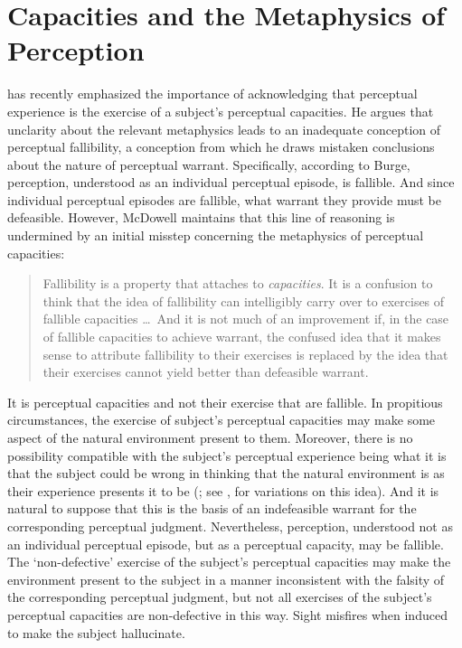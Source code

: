 \documentclass[12pt]{article}
\begin{document}

\section{Capacities and the Metaphysics of Perception} %
\label{sec:capacities_and_the_metaphysics_of_perception}

\citet{McDowell:2010fk} has recently emphasized the importance of acknowledging that perceptual experience is the exercise of a subject's perceptual capacities. He argues that unclarity about the relevant metaphysics leads \citet{Burge:2005uq} to an inadequate conception of perceptual fallibility, a conception from which he draws mistaken conclusions about the nature of perceptual warrant. Specifically, according to Burge, perception, understood as an individual perceptual episode, is fallible. And since individual perceptual episodes are fallible, what warrant they provide must be defeasible. However, McDowell maintains that this line of reasoning is undermined by an initial misstep concerning the metaphysics of perceptual capacities:
\begin{quote}
	Fallibility is a property that attaches to \emph{capacities}. It is a confusion to think that the idea of fallibility can intelligibly carry over to exercises of fallible capacities \ldots\ And it is not much of an improvement if, in the case of fallible capacities to achieve warrant, the confused idea that it makes sense to attribute fallibility to their exercises is replaced by the idea that their exercises cannot yield better than defeasible warrant. \citep[245]{McDowell:2010fk}
\end{quote}
It is perceptual capacities and not their exercise that are fallible. In propitious circumstances, the exercise of subject's perceptual capacities may make some aspect of the natural environment present to them. Moreover, there is no possibility compatible with the subject's perceptual experience being what it is that the subject could be wrong in thinking that the natural environment is as their experience presents it to be (\citealt[245]{McDowell:2010fk}; see  \citealt{Johnston:2006uq}, \citealt{Kalderon:2011fk} for variations on this idea). And it is natural to suppose that this is the basis of an indefeasible warrant for the corresponding perceptual judgment. Nevertheless, perception, understood not as an individual perceptual episode, but as a perceptual capacity, may be fallible. The `non-defective' exercise of the subject's perceptual capacities may make the environment present to the subject in a manner inconsistent with the falsity of the corresponding perceptual judgment, but not all exercises of the subject's perceptual capacities are non-defective in this way. Sight misfires when induced to make the subject hallucinate.
\end{document}

